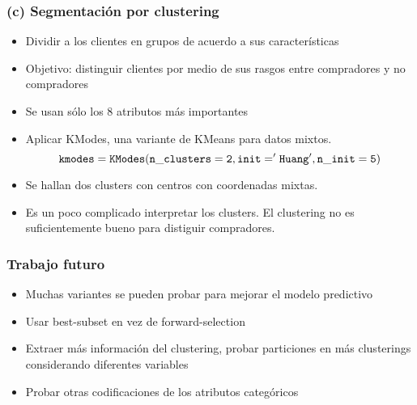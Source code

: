 \documentclass{beamer}
\begin{document}
\begin{frame}%
        \frametitle{(c) Segmentación por clustering}
        \begin{itemize}
            \item Dividir a los clientes en grupos de acuerdo a sus características
            \item Objetivo: distinguir clientes por medio de sus rasgos entre compradores y no compradores
            \item Se usan sólo los 8 atributos más importantes
            \item Aplicar KModes, una variante de KMeans para datos mixtos.
                \[{\tt kmodes = KModes(n\_clusters=2, init='Huang', n\_init=5)}\]

            \item Se hallan dos clusters con centros con coordenadas mixtas. 
            \item Es un poco complicado interpretar los clusters. El clustering no es suficientemente bueno para
                distiguir compradores. 
        \end{itemize}
    \end{frame}
    \begin{frame}
        \frametitle{Trabajo futuro}
        \begin{itemize}
            \item Muchas variantes se pueden probar para mejorar el modelo predictivo
            \item Usar best-subset en vez de forward-selection
            \item Extraer más información del clustering, probar particiones en más clusterings considerando diferentes
                variables
            \item Probar otras codificaciones de los atributos categóricos
        \end{itemize}
    \end{frame}
    
\end{document}
